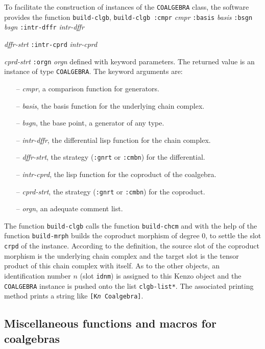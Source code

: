 To facilitate the construction of instances of the {\tt COALGEBRA} class, the
software provides the function {\tt build-clgb},
\vskip 0.40cm
{\tt build-clgb :cmpr} {\em cmpr} {\tt :basis} {\em basis} {\tt :bsgn} {\em bsgn} {\tt :intr-dffr} {\em intr-dffr} \par
\hspace*{22.5mm}{\tt :dffr-strt} {\em dffr-strt} {\tt :intr-cprd} {\em intr-cprd} \par
\hspace*{22.5mm}{\tt :cprd-strt} {\em cprd-strt} {\tt :orgn} {\em orgn}
\vskip 0.40cm
defined with keyword parameters. The returned value is an instance of type {\tt COALGEBRA}.
The keyword arguments are:
\begin{itemize}
\item[--] {\em cmpr}, a comparison function for generators.
\item[--] {\em basis}, the basis function for the underlying chain complex.
\item[--] {\em bsgn}, the  base point, a generator of any type.
\item[--] {\em intr-dffr}, the differential lisp function for the chain complex.
\item[--] {\em dffr-strt}, the strategy ({\tt :gnrt} or {\tt :cmbn}) for the differential.
\item[--] {\em intr-cprd}, the lisp function for the coproduct of the coalgebra.
\item[--] {\em cprd-strt}, the strategy ({\tt :gnrt} or {\tt :cmbn}) for the coproduct.
\item[--] {\em orgn}, an adequate comment list.
\end{itemize}
The function {\tt build-clgb} calls  the function {\tt build-chcm} and with the help of the function
{\tt build-mrph} builds the coproduct morphism of degree $0$, to settle the
slot {\tt crpd} of the instance. According to the definition, the
source slot of the coproduct morphism is the underlying chain complex and the target slot
is the tensor product of this chain complex with itself. As to the other objects,
an identification number $n$ (slot {\tt idnm}) is assigned to this Kenzo object and the
{\tt COALGEBRA} instance is  pushed  onto the list {\tt *clgb-list*}.
The  associated printing method prints a string like
{\tt [K{\em n} Coalgebra]}.

\subsection {Miscellaneous functions and macros for coalgebras}

